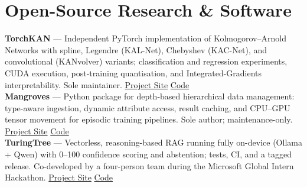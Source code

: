 \section{Open-Source Research \& Software}

{\small
\textbf{TorchKAN} --- Independent PyTorch implementation of Kolmogorov--Arnold Networks with spline, Legendre (KAL-Net), Chebyshev (KAC-Net), and convolutional (KANvolver) variants; classification and regression experiments, CUDA execution, post-training quantisation, and Integrated-Gradients interpretability. Sole maintainer. \href{https://1ssb.github.io/torchkan/}{Project Site} \textbar{} \href{https://github.com/1ssb/torchkan}{Code}\\[2pt]
\textbf{Mangroves} --- Python package for depth-based hierarchical data management: type-aware ingestion, dynamic attribute access, result caching, and CPU--GPU tensor movement for episodic training pipelines. Sole author; maintenance-only. \href{https://1ssb.github.io/mangroves/}{Project Site} \textbar{} \href{https://github.com/1ssb/mangroves}{Code}\\[2pt]
\textbf{TuringTree} --- Vectorless, reasoning-based RAG running fully on-device (Ollama + Qwen) with 0--100 confidence scoring and abstention; tests, CI, and a tagged release. Co-developed by a four-person team during the Microsoft Global Intern Hackathon. \href{https://1ssb.github.io/TuringTree/}{Project Site} \textbar{} \href{https://github.com/1ssb/TuringTree}{Code}
}
